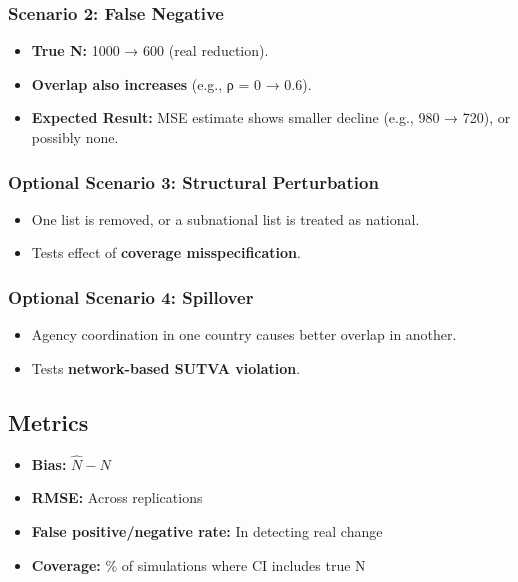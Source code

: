\documentclass[
  12pt,
]{article}
\providecommand{\tightlist}{%
  \setlength{\itemsep}{0pt}\setlength{\parskip}{0pt}}\usepackage{longtable,booktabs,array}
\theoremstyle{plain}
\theoremstyle{definition}
\begin{document}
\subsubsection{Scenario 2: False
Negative}\label{scenario-2-false-negative}

\begin{itemize}
\tightlist
\item
  \textbf{True N:} 1000 → 600 (real reduction).\\
\item
  \textbf{Overlap also increases} (e.g., ρ = 0 → 0.6).\\
\item
  \textbf{Expected Result:} MSE estimate shows smaller decline (e.g.,
  980 → 720), or possibly none.
\end{itemize}

\subsubsection{Optional Scenario 3: Structural
Perturbation}\label{optional-scenario-3-structural-perturbation}

\begin{itemize}
\tightlist
\item
  One list is removed, or a subnational list is treated as national.\\
\item
  Tests effect of \textbf{coverage misspecification}.
\end{itemize}

\subsubsection{Optional Scenario 4:
Spillover}\label{optional-scenario-4-spillover}

\begin{itemize}
\tightlist
\item
  Agency coordination in one country causes better overlap in another.\\
\item
  Tests \textbf{network-based SUTVA violation}.
\end{itemize}

\subsection{Metrics}\label{metrics}

\begin{itemize}
\tightlist
\item
  \textbf{Bias:} \(\hat{N} - N\)\\
\item
  \textbf{RMSE:} Across replications\\
\item
  \textbf{False positive/negative rate:} In detecting real change\\
\item
  \textbf{Coverage:} \% of simulations where CI includes true N
\end{itemize}
\end{document}
